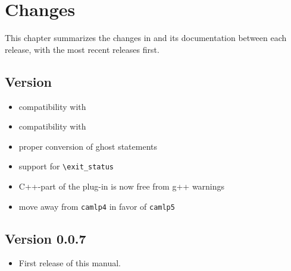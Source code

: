 \chapter{Changes}\label{chap:changes}

This chapter summarizes the changes in \fclang and its documentation
between each release, with the most recent releases first.

\section*{Version \fclangversion}
\begin{itemize}
\item compatibility with 
\item compatibility with 
\item proper conversion of ghost statements
\item support for \acslpp \lstinline|\exit_status|
\item C++-part of the plug-in is now free from g++ warnings
\item move away from \lstinline|camlp4| in favor of \lstinline|camlp5|
\end{itemize}

\section*{Version 0.0.7}
\begin{itemize}
\item First release of this manual.
\end{itemize}
